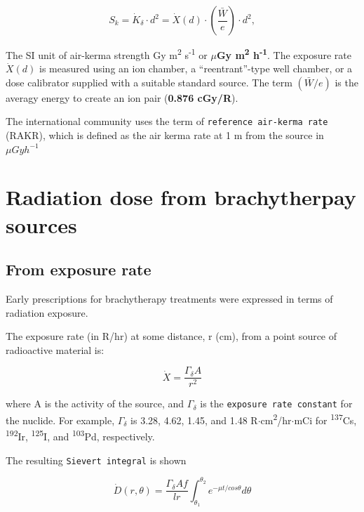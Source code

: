 \documentclass[]{book}
\theoremstyle{definition}
\theoremstyle{definition}
\theoremstyle{definition}
\theoremstyle{remark}
\begin{document}
\begin{equation}
  S_k =\dot K_\delta \cdot d^2 = \dot X(d) \cdot  \left( \frac{\bar W}{e}\right) \cdot d^2,
  \label{eq:sk}
\end{equation}

The SI unit of air-kerma strength Gy m\textsuperscript{2}
s\textsuperscript{-1} or \textbf{\(\mu\)Gy m\textsuperscript{2}
h\textsuperscript{-1}}. The exposure rate \(\dot X(d)\) is measured
using an ion chamber, a ``reentrant''-type well chamber, or a dose
calibrator supplied with a suitable standard source. The term
\(({\bar W}/e )\) is the averagy energy to create an ion pair
(\textbf{0.876 cGy/R}).

The international community uses the term of
\texttt{reference\ air-kerma\ rate} (RAKR), which is defined as the air
kerma rate at 1 m from the source in \(\mu Gy h^{-1}\)

\section{Radiation dose from brachytherpay
sources}\label{radiation-dose-from-brachytherpay-sources}

\subsection{From exposure rate}\label{from-exposure-rate}

Early prescriptions for brachytherapy treatments were expressed in terms
of radiation exposure.

The exposure rate (in R/hr) at some distance, r (cm), from a point
source of radioactive material is:

\begin{equation}
   \dot X = \frac{\Gamma_{\delta}A}{r^2}
   \label{eq:exposure}
\end{equation}

where A is the activity of the source, and \(\Gamma_{\delta}\) is the
\texttt{exposure\ rate\ constant} for the nuclide. For example,
\(\Gamma_{\delta}\) is 3.28, 4.62, 1.45, and 1.48
R\(\cdot\)cm\textsuperscript{2}/hr\(\cdot\)mCi for
\textsuperscript{137}Cs, \textsuperscript{192}Ir,
\textsuperscript{125}I, and \textsuperscript{103}Pd, respectively.

The resulting \texttt{Sievert\ integral} is shown

\begin{equation}
   \dot D(r, \theta) = \frac{\Gamma_{\delta}Af}{lr}\int^{\theta_2}_{\theta_1}e^{-\mu t/cos{\theta}}d\theta
\end{equation}
\end{document}
